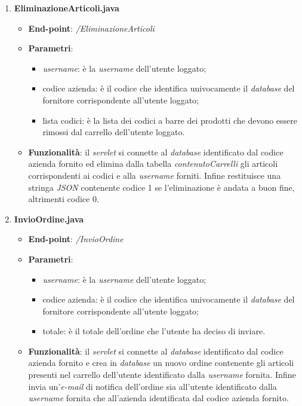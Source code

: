 \documentclass[12pt, a4paper, titlepage]{report}
\begin{document}
\begin{enumerate}
		\item \textbf{EliminazioneArticoli.java}
		\begin{itemize}
			\item \textbf{End-point}: \textit{/EliminazioneArticoli}
			\item \textbf{Parametri}:
			\begin{itemize}
				\item \textit{username}: è la \textit{username} dell'utente loggato;
				\item codice azienda: è il codice che identifica univocamente il \textit{database} del fornitore corrispondente all'utente loggato;
				\item lista codici: è la lista dei codici a barre dei prodotti che devono essere rimossi dal carrello dell'utente loggato.
			\end{itemize}
			\item \textbf{Funzionalità}: il \textit{servlet} si connette al \textit{database} identificato dal codice azienda fornito ed elimina dalla tabella \textit{contenutoCarrelli} gli articoli corrispondenti ai codici e alla \textit{username} forniti. Infine restituisce una stringa \textit{JSON} contenente codice 1 se l'eliminazione è andata a buon fine, altrimenti codice 0.
		\end{itemize}
	
		\item \textbf{InvioOrdine.java}
		\begin{itemize}
			\item \textbf{End-point}: \textit{/InvioOrdine}
			\item \textbf{Parametri}:
			\begin{itemize}
				\item \textit{username}: è la \textit{username} dell'utente loggato;
				\item codice azienda: è il codice che identifica univocamente il \textit{database} del fornitore corrispondente all'utente loggato;
				\item totale: è il totale dell'ordine che l'utente ha deciso di inviare.
			\end{itemize}
			\item \textbf{Funzionalità}: il \textit{servlet} si connette al \textit{database} identificato dal codice azienda fornito e crea in \textit{database} un nuovo ordine contenente gli articoli presenti nel carrello dell'utente identificato dalla \textit{username} fornita. Infine invia un'\textit{e-mail} di notifica dell'ordine sia all'utente identificato dalla \textit{username} fornita che all'azienda identificata dal codice azienda fornito.
		\end{itemize}
	

\end{enumerate}
\end{document}
